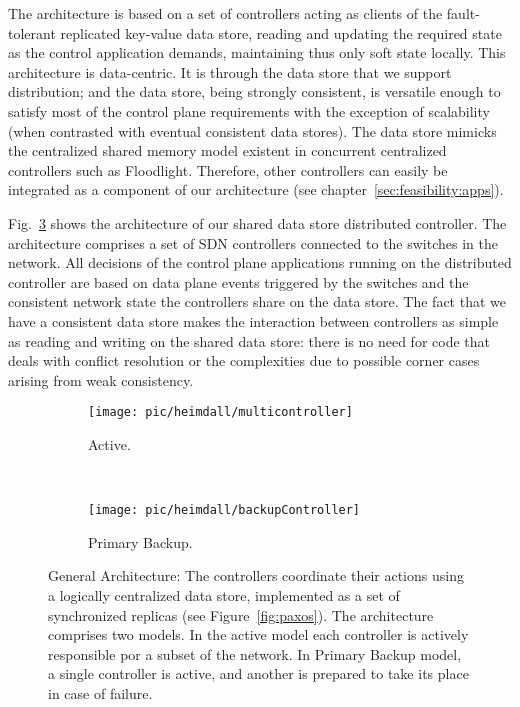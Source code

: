 The architecture is based on a set of controllers acting as clients of the fault-tolerant replicated key-value data store, reading and updating the required state as the control application demands, maintaining thus only soft state locally. 
This architecture is data-centric. 
It is through the data store that we support distribution;  and the data store, being strongly consistent,  is versatile enough to satisfy most of the control plane requirements with the exception of scalability (when contrasted with eventual consistent data stores). 
The data store mimicks the centralized shared memory model existent in concurrent centralized controllers such as Floodlight. 
Therefore, other controllers can easily be integrated as a component of our architecture  (see chapter~\ref{sec:feasibility:apps}). 

Fig.~\ref{fig:architecture} shows the architecture of our shared data store distributed controller.
The architecture comprises a set of SDN controllers connected to the switches in the network.
All decisions of the control plane applications running on the distributed controller are based on data plane events triggered by the switches and the consistent network state the controllers share on the data store.
The fact that we have a consistent data store makes the interaction between controllers as simple as reading and writing on the shared data store: there is no need for code that deals with conflict resolution or the complexities due to possible corner cases arising from weak consistency.



\begin{figure}
  \centering
  \begin{subfigure}[b]{0.545\textwidth}
                \centering
                \texttt{[image: pic/heimdall/multicontroller]}
                \caption{Active.}
                \label{fig:heimdall:active}
        \end{subfigure}%
        ~
        \begin{subfigure}[b]{0.465\textwidth}
                \centering
                \texttt{[image: pic/heimdall/backupController]}
                \caption{Primary Backup.}
                \label{fig:heimdall:primary-backup}
        \end{subfigure}
        \caption[General Architecture.]{General Architecture: The controllers coordinate their actions using a logically centralized data store, implemented as a set of synchronized replicas (see Figure~\ref{fig:paxos}). The architecture comprises two models. In the active model each controller is actively responsible por a subset of the network. In Primary Backup model, a single controller is active, and another is prepared to take its place in case of failure.}
        \label{fig:architecture} 
\end{figure}

